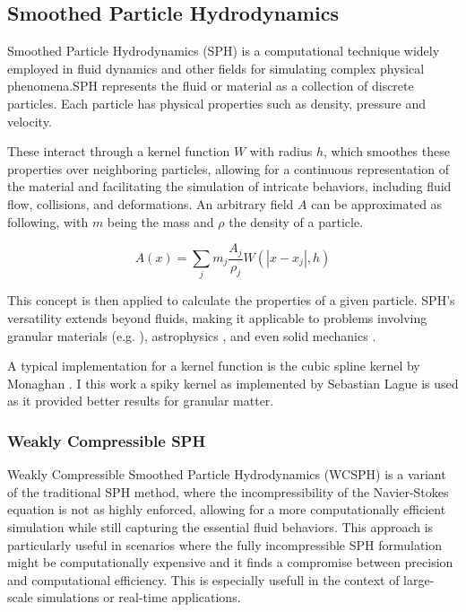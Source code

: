 \documentclass[intern]{cgMA}
\begin{document}
    \subsection{Smoothed Particle Hydrodynamics}
    Smoothed Particle Hydrodynamics (SPH) is a computational technique widely employed in fluid dynamics and other fields for simulating complex physical phenomena.SPH represents the fluid or material as a collection of discrete particles. Each particle has physical properties such as density, pressure and velocity. 

    These interact through a kernel function $W$ with radius $h$, which smoothes these properties over neighboring particles, allowing for a continuous representation of the material and facilitating the simulation of intricate behaviors, including fluid flow, collisions, and deformations. An arbitrary field $A$ can be approximated as following, with $m$ being the mass and $\rho$ the density of a particle. \cite{wcsph} 

    \begin{equation}
        A(x) = \sum_j m_j \frac{A_j}{\rho_j} W(|x - x_j|, h)
    \end{equation}

    This concept is then applied to calculate the properties of a given particle. SPH's versatility extends beyond fluids, making it applicable to problems involving granular materials (e.g. \cite{10.2312:LocalChapterEvents:CEIG:CEIG09:011-018}), astrophysics \cite{Springel_2010}, and even solid mechanics \cite{solid_mechanics}. 

    A typical implementation for a kernel function is the cubic spline kernel by Monaghan \cite{doi:10.1146/annurev.aa.30.090192.002551}. I this work a spiky kernel as implemented by Sebastian Lague \cite{seblague} is used as it provided better results for granular matter.

    \subsubsection*{Weakly Compressible SPH}
    Weakly Compressible Smoothed Particle Hydrodynamics (WCSPH) is a variant of the traditional SPH method, where the incompressibility of the Navier-Stokes equation is not as highly enforced, allowing for a more computationally efficient simulation while still capturing the essential fluid behaviors. This approach is particularly useful in scenarios where the fully incompressible SPH formulation might be computationally expensive and it finds a compromise between precision and computational efficiency. This is especially usefull in the context of large-scale simulations or real-time applications.\cite{wcsph}
\end{document}
